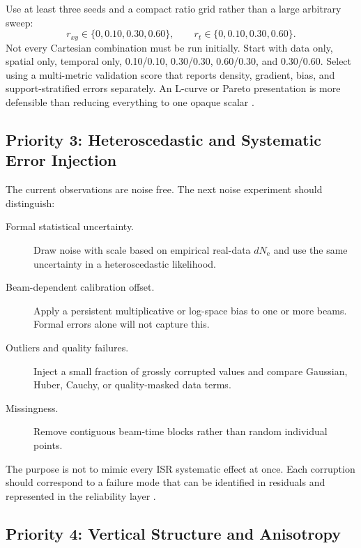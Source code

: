 \documentclass[11pt]{article}
\newcommand{\Ne}{N_{\mathrm e}}
\begin{document}
Use at least three seeds and a compact ratio grid rather than a large arbitrary sweep:
\begin{equation}
  r_{xy}\in\{0,0.10,0.30,0.60\},\qquad
  r_t\in\{0,0.10,0.30,0.60\}.
\end{equation}
Not every Cartesian combination must be run initially. Start with data only, spatial only, temporal only,
0.10/0.10, 0.30/0.30, 0.60/0.30, and 0.30/0.60. Select using a multi-metric validation score that reports
density, gradient, bias, and support-stratified errors separately. An L-curve or Pareto presentation is more
defensible than reducing everything to one opaque scalar \cite{Hansen1992LCurve}.

\subsection{Priority 3: Heteroscedastic and Systematic Error Injection}

The current observations are noise free. The next noise experiment should distinguish:
\begin{description}
  \item[Formal statistical uncertainty.] Draw noise with scale based on empirical real-data $d\Ne$ and use
  the same uncertainty in a heteroscedastic likelihood.
  \item[Beam-dependent calibration offset.] Apply a persistent multiplicative or log-space bias to one or
  more beams. Formal errors alone will not capture this.
  \item[Outliers and quality failures.] Inject a small fraction of grossly corrupted values and compare
  Gaussian, Huber, Cauchy, or quality-masked data terms.
  \item[Missingness.] Remove contiguous beam-time blocks rather than random individual points.
\end{description}

The purpose is not to mimic every ISR systematic effect at once. Each corruption should correspond to a
failure mode that can be identified in residuals and represented in the reliability layer
\cite{LehtinenHuuskonen1996,HuuskonenLehtinen1996,Diaz2026ISRError}.

\subsection{Priority 4: Vertical Structure and Anisotropy}
\end{document}
